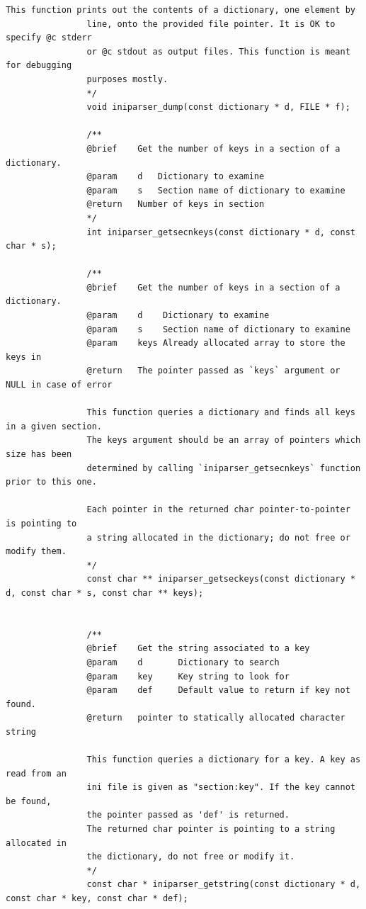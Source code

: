 \documentclass{article}
\begin{document}
\begin{Verbatim}[gobble=8]
                This function prints out the contents of a dictionary, one element by
                line, onto the provided file pointer. It is OK to specify @c stderr
                or @c stdout as output files. This function is meant for debugging
                purposes mostly.
                */
                void iniparser_dump(const dictionary * d, FILE * f);
                
                /**
                @brief    Get the number of keys in a section of a dictionary.
                @param    d   Dictionary to examine
                @param    s   Section name of dictionary to examine
                @return   Number of keys in section
                */
                int iniparser_getsecnkeys(const dictionary * d, const char * s);
                
                /**
                @brief    Get the number of keys in a section of a dictionary.
                @param    d    Dictionary to examine
                @param    s    Section name of dictionary to examine
                @param    keys Already allocated array to store the keys in
                @return   The pointer passed as `keys` argument or NULL in case of error
                
                This function queries a dictionary and finds all keys in a given section.
                The keys argument should be an array of pointers which size has been
                determined by calling `iniparser_getsecnkeys` function prior to this one.
                
                Each pointer in the returned char pointer-to-pointer is pointing to
                a string allocated in the dictionary; do not free or modify them.
                */
                const char ** iniparser_getseckeys(const dictionary * d, const char * s, const char ** keys);
                
                
                /**
                @brief    Get the string associated to a key
                @param    d       Dictionary to search
                @param    key     Key string to look for
                @param    def     Default value to return if key not found.
                @return   pointer to statically allocated character string
                
                This function queries a dictionary for a key. A key as read from an
                ini file is given as "section:key". If the key cannot be found,
                the pointer passed as 'def' is returned.
                The returned char pointer is pointing to a string allocated in
                the dictionary, do not free or modify it.
                */
                const char * iniparser_getstring(const dictionary * d, const char * key, const char * def);
                

\end{Verbatim}
\end{document}
